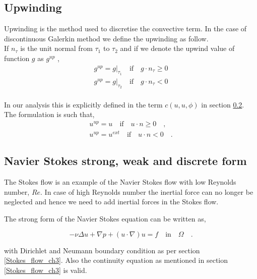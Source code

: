 \documentclass[a4paper,openany]{book}
\begin{document}
\subsection{Upwinding} \label{upwinding}

Upwinding is the method used to discretise the convective term. In the case of discontinuous Galerkin method we define the upwinding as follow.\\

If $n_\tau$ is the unit normal from $\tau_1$ to $\tau_2$ and if we denote the upwind value of function $g$ as $g^{up}$ \cite{riviere},
\begin{equation}
\begin{split}
g^{up} = g|_{\tau_1} \quad \textrm{if} \quad g \cdot n_\tau \geq 0 \\
g^{up} = g|_{\tau_2} \quad \textrm{if} \quad g \cdot n_\tau < 0
\end{split}
\end{equation}
\\
In our analysis this is explicitly defined in the term $c(u,u,\phi)$ in section \ref{n_s_ch3}. The formulation is such that,
\begin{equation}
\begin{split}
u^{up} = u \quad \textrm{if} \quad u \cdot n \geq 0 \quad \textrm{,}\\
u^{up} = u^{ext} \quad \textrm{if} \quad u \cdot n < 0 \quad \textrm{.}
\end{split}
\end{equation}

\subsection{Navier Stokes strong, weak and discrete form} \label{n_s_ch3}

The Stokes flow is an example of the Navier Stokes flow with low Reynolds number, $Re$. In case of high Reynolds number the inertial force can no longer be neglected and hence we need to add inertial forces in the Stokes flow. 

The strong form of the Navier Stokes equation can be written as,

\begin{equation} \label{navier_stokes_strong_ch3}
-\nu \Delta u + \nabla p + (u \cdot \nabla) u = f \quad \textrm{in} \quad \Omega \quad \textrm{.}
\end{equation}

with Dirichlet and Neumann boundary condition as per section \ref{Stokes_flow_ch3}. Also the continuity equation as mentioned in section \ref{Stokes_flow_ch3} is valid.
\end{document}
